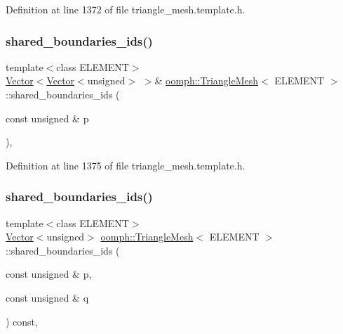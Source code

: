 Definition at line 1372 of file triangle\+\_\+mesh.\+template.\+h.

\mbox{\label{classoomph_1_1TriangleMesh_a582bf4ae8707a1eee837979be493ab2b}} 
\subsubsection{\texorpdfstring{shared\+\_\+boundaries\+\_\+ids()}{shared\_boundaries\_ids()}\hspace{0.1cm}{\footnotesize\ttfamily [4/7]}}
{\footnotesize\ttfamily template$<$class E\+L\+E\+M\+E\+NT$>$ \\
\hyperlink{classoomph_1_1Vector}{Vector}$<$\hyperlink{classoomph_1_1Vector}{Vector}$<$unsigned$>$ $>$\& \hyperlink{classoomph_1_1TriangleMesh}{oomph\+::\+Triangle\+Mesh}$<$ E\+L\+E\+M\+E\+NT $>$\+::shared\+\_\+boundaries\+\_\+ids (\begin{DoxyParamCaption}\item[{const unsigned \&}]{p }\end{DoxyParamCaption})\hspace{0.3cm}{\ttfamily [inline]}, {\ttfamily [protected]}}



Definition at line 1375 of file triangle\+\_\+mesh.\+template.\+h.

\mbox{\label{classoomph_1_1TriangleMesh_afefc89a2e4555fa024dd2de1151df160}} 
\subsubsection{\texorpdfstring{shared\+\_\+boundaries\+\_\+ids()}{shared\_boundaries\_ids()}\hspace{0.1cm}{\footnotesize\ttfamily [5/7]}}
{\footnotesize\ttfamily template$<$class E\+L\+E\+M\+E\+NT$>$ \\
\hyperlink{classoomph_1_1Vector}{Vector}$<$unsigned$>$ \hyperlink{classoomph_1_1TriangleMesh}{oomph\+::\+Triangle\+Mesh}$<$ E\+L\+E\+M\+E\+NT $>$\+::shared\+\_\+boundaries\+\_\+ids (\begin{DoxyParamCaption}\item[{const unsigned \&}]{p,  }\item[{const unsigned \&}]{q }\end{DoxyParamCaption}) const\hspace{0.3cm}{\ttfamily [inline]}, {\ttfamily [protected]}}



